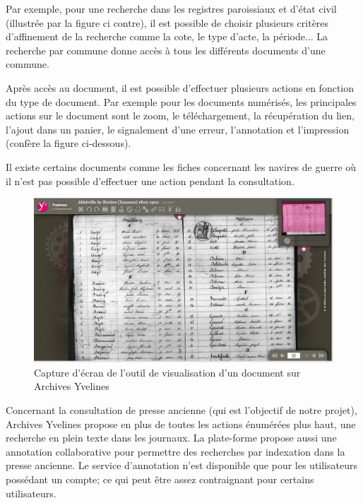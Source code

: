         Par exemple, pour une recherche dans les registres paroissiaux et d’état civil (illustrée par la figure ci contre),
        il est possible de choisir plusieurs critères d’affinement de la recherche comme la cote, le type d’acte, la période...
        La recherche par commune donne accès à tous les différents documents d’une commune.

        Après accès au document, il est possible d’effectuer plusieurs actions en fonction du type de document.
        Par exemple pour les documents numérisés, les principales actions sur le document sont le zoom, le téléchargement,
        la récupération du lien, l’ajout dans un panier, le signalement d’une erreur, l’annotation et l’impression (confère la figure ci-dessous).

        Il existe certains documents comme les fiches concernant les navires de guerre où il n’est pas possible d’effectuer
        une action pendant la consultation.

        \begin{figure}[ht!]
            \centering
            \includegraphics[width=1\textwidth]{figure/screen_yvelines_document.png}
            \caption{Capture d'écran de l'outil de visualisation d'un document sur Archives Yvelines}
            \label{fig:yvelines_doc}
        \end{figure}

        Concernant la consultation de presse ancienne (qui est l’objectif de notre projet), Archives Yvelines propose en plus
        de toutes les actions énumérées plus haut, une recherche en plein texte dans les journaux. La plate-forme propose
        aussi une annotation collaborative pour permettre des recherches par indexation dans la presse ancienne. Le service d’annotation
        n’est disponible que pour les utilisateurs possédant un compte; ce qui peut être assez contraignant pour certains utilisateurs.

